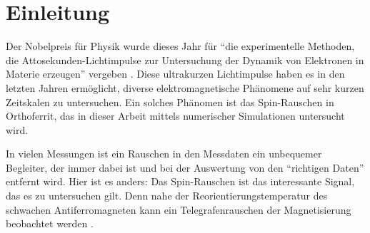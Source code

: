 \documentclass[main.tex]{subfiles}
\begin{document}
\section{Einleitung}

Der Nobelpreis für Physik wurde dieses Jahr für \enquote{die experimentelle Methoden, die Attosekunden-Lichtimpulse zur Untersuchung der Dynamik von Elektronen in Materie erzeugen} vergeben \cite{nobel-phy-2023}. Diese ultrakurzen Lichtimpulse haben es in den letzten Jahren ermöglicht, diverse elektromagnetische Phänomene auf sehr kurzen Zeitskalen zu untersuchen. Ein solches Phänomen ist das Spin-Rauschen in Orthoferrit, das in dieser Arbeit mittels numerischer Simulationen untersucht wird.

In vielen Messungen ist ein Rauschen in den Messdaten ein unbequemer Begleiter, der immer dabei ist und bei der Auswertung von den \enquote{richtigen Daten} entfernt wird. Hier ist es anders: Das Spin-Rauschen ist das interessante Signal, das es zu untersuchen gilt. Denn nahe der Reorientierungstemperatur des schwachen Antiferromagneten kann ein Telegrafenrauschen der Magnetisierung beobachtet werden \cite{weiss-ultrafast}.

\end{document}
